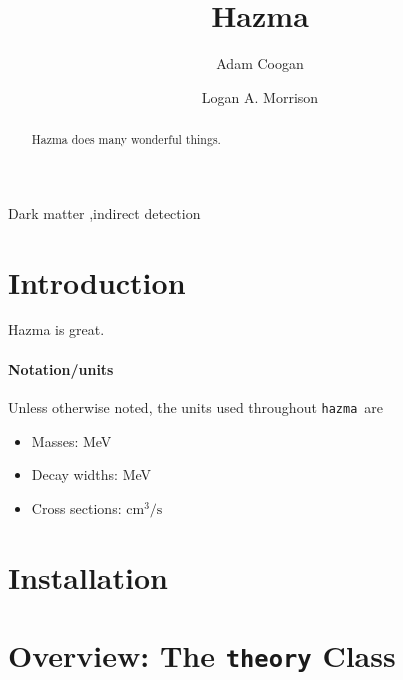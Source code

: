 \documentclass[review]{elsarticle}
\newcommand{\mil}[1]{\texttt{#1}}
\renewcommand\u[1]{{\mathrm{#1}}}
\newcommand{\hazma}{\mil{hazma}}
\begin{document}
\begin{frontmatter}

\title{Hazma}

\author[grappa,ucsc,scipp]{Adam Coogan}

\author[ucsc,scipp]{Logan A. Morrison}

\address[grappa]{GRAPPA, Institute of Physics, University of Amsterdam, 1098 XH Amsterdam, The Netherlands}
\address[ucsc]{Department of Physics, 1156 High St., University of California Santa Cruz, Santa Cruz, CA 95064, USA}
\address[scipp]{Santa Cruz Institute for Particle Physics, 1156 High St., Santa Cruz, CA 95064, USA}

\begin{abstract}
    Hazma does many wonderful things.
\end{abstract}

\begin{keyword}
Dark matter \sep indirect detection
\end{keyword}

\end{frontmatter}

\section{Introduction}

Hazma is great.

\paragraph{Notation/units} Unless otherwise noted, the units used throughout \hazma\ are
\begin{itemize}
    \item Masses: MeV
    \item Decay widths: MeV
    \item Cross sections: $\u{cm}^3 / \u{s}$
\end{itemize}

\section{Installation}%
\label{sec:installation}

\section{Overview: The \texttt{theory} Class}%
\label{sec:overview_the_theory_class}
\end{document}

